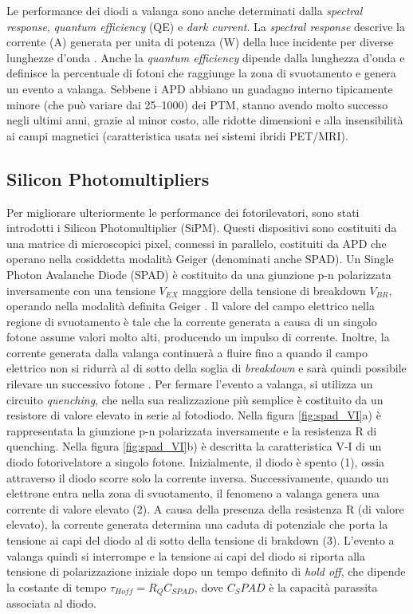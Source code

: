 Le performance dei diodi a valanga sono anche determinati dalla \textit{spectral response}, \textit{quantum efficiency} (QE) e \textit{dark current}. La \textit{spectral response} descrive la corrente (A) generata per unita di potenza (W) della luce incidente per diverse lunghezze d'onda \cite{Jiang2019}. Anche la \textit{quantum efficiency} dipende dalla lunghezza d'onda e definisce la percentuale di fotoni che raggiunge la zona di svuotamento e genera un evento a valanga. Sebbene i APD abbiano un guadagno interno tipicamente minore (che può variare dai \numrange[range-phrase=--]{25}{1000}) dei PTM, stanno avendo molto successo negli ultimi anni, grazie al minor costo, alle ridotte dimensioni e alla insensibilità ai campi magnetici (caratteristica usata nei sistemi ibridi PET/MRI).

\clearpage
\subsection{Silicon Photomultipliers}
Per migliorare ulteriormente le performance dei fotorilevatori, sono stati introdotti i Silicon Photomultiplier (SiPM). Questi dispositivi sono costituiti da una matrice di microscopici pixel, connessi in parallelo, costituiti da APD che operano nella cosiddetta modalità Geiger (denominati anche SPAD). Un Single Photon Avalanche Diode (SPAD) è costituito da una giunzione p-n polarizzata inversamente con una tensione $V_{EX}$ maggiore della tensione di breakdown $V_{BR}$, operando nella modalità definita Geiger \cite{Jiang2019}. Il valore del campo elettrico nella regione di svuotamento è tale che la corrente generata a causa di un singolo fotone assume valori molto alti, producendo un impulso di corrente. Inoltre, la corrente generata dalla valanga continuerà a fluire fino a quando il campo elettrico non si ridurrà al di sotto della soglia di \textit{breakdown} e sarà quindi possibile rilevare un successivo fotone \cite{Palubiak2011}. Per fermare l'evento a valanga, si utilizza un circuito \textit{quenching}, che nella sua realizzazione più semplice è costituito da un resistore di valore elevato in serie al fotodiodo. Nella figura \ref{fig:spad_VI}a) è rappresentata la giunzione p-n polarizzata inversamente e la resistenza R di quenching. Nella figura \ref{fig:spad_VI}b) è descritta la caratteristica V-I di un diodo fotorivelatore a singolo fotone. Inizialmente, il diodo è spento (1), ossia attraverso il diodo scorre solo la corrente inversa. Successivamente, quando un elettrone entra nella zona di svuotamento, il fenomeno a valanga genera una corrente di valore elevato (2). A causa della presenza della resistenza R (di valore elevato), la corrente generata determina una caduta di potenziale che porta la tensione ai capi del diodo al di sotto della tensione di brakdown (3). L'evento a valanga quindi si interrompe e la tensione ai capi del diodo si riporta alla tensione di polarizzazione iniziale dopo un tempo definito di \textit{hold off}, che dipende la costante di tempo $\tau_{Hoff}=R_QC_{SPAD}$, dove $C_SPAD$ è la capacità parassita associata al diodo.
